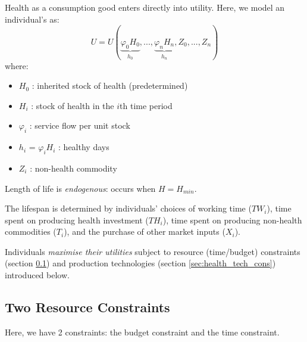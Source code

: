         Health as a consumption good enters directly into utility. Here, we model an individual's  as:
        \begin{equation*}
            U = U(\underbrace{\varphi_0 H_0}_{h_0},...,\underbrace{\varphi_n H_n}_{h_n},Z_0,...,Z_n)
        \end{equation*}
        where:
        \begin{itemize}
            \item $H_0$ : inherited stock of health (predetermined)
            \item $H_i$ : stock of health in the $i$th time period
            \item $\varphi_i$ : service flow per unit stock
            \item $h_i$ = $\varphi_iH_i$ : healthy days
            \item $Z_i$ : non-health commodity
        \end{itemize}
        Length of life is \emph{endogenous}:  occurs when $H = H_{min}$. 
        
        The lifespan is determined by individuals' choices of working time ($TW_i$), time spent on producing health investment ($TH_i$), time spent on producing non-health commodities ($T_i$), and the purchase of other market inputs ($X_i$).
        
        Individuals \emph{maximise their utilities} subject to resource (time/budget) constraints (section \ref{sec:health_res_cons}) and production technologies (section \ref{sec:health_tech_cons}) introduced below.

    \subsection{Two Resource Constraints}\label{sec:health_res_cons}
    
        Here, we have 2 constraints: the budget constraint and the time constraint.

